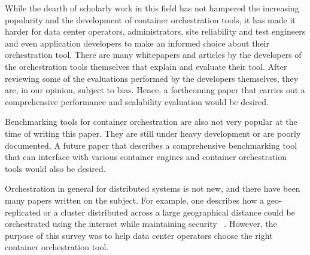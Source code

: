 \documentclass[10pt,twocolumn]{article}
\begin{document}
While the dearth of scholarly work in this field has not hampered the increasing popularity and the development of container orchestration tools, it has made it harder for data center operators, administrators, site reliability and test engineers and even application developers to make an informed choice about their orchestration tool.
There are many whitepapers and articles by the developers of the orchestration tools themselves that explain and evaluate their tool.
After reviewing some of the evaluations performed by the developers themselves, they are, in our opinion, subject to bias.
Hence, a forthcoming paper that carries out a comprehensive performance and scalability evaluation would be desired.

Benchmarking tools for container orchestration are also not very popular at the time of writing this paper.
They are still under heavy development or are poorly documented.
A future paper that describes a comprehensive benchmarking tool that can interface with various container engines and container orchestration tools would also be desired.

Orchestration in general for distributed systems is not new, and there have been many papers written on the subject.
For example, one describes how a geo-replicated or a cluster distributed across a large geographical distance could be orchestrated using the internet while maintaining security ~\cite{intro_orchestration}.
However, the purpose of this survey was to help data center operators choose the right container orchestration tool.



\end{document}
